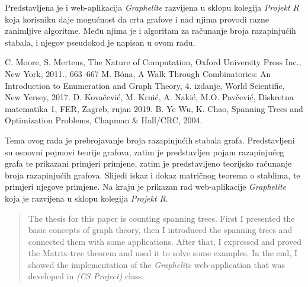 \documentclass[times, utf8, zavrsni]{fer}
\begin{document}
Predstavljena je i web-aplikacija \textit{Graphelite} razvijena u sklopu kolegija \textit{Projekt R} koja korisniku daje mogućnost da crta grafove i nad njima provodi razne zanimljive algoritme. Među njima je i algoritam za računanje broja razapinjućih stabala, i njegov pseudokod je napisan u ovom radu.



\begin{thebibliography}{6}
	C. Moore, S. Mertens, The Nature of Computation, Oxford University Press Inc., New York, 2011., 663--667
	M. Bóna, A Walk Through Combinatorics: An Introduction to Enumeration and Graph Theory, 4. izdanje, World Scientific, New Yersey, 2017.
	D. Kovačević, M. Krnić, A. Nakić, M.O. Pavčević, Diskretna matematika 1, FER, Zagreb, rujan 2019.
	B. Ye Wu, K. Chao, Spanning Trees and Optimization Problems, Chapman \& Hall/CRC, 2004.
\end{thebibliography}

\begin{sazetak}
Tema ovog rada je prebrojavanje broja razapinjućih stabala grafa. Predstavljeni su osnovni pojmovi teorije grafova, zatim je predstavljen pojam razapinjućeg grafa te prikazani primjeri primjene, zatim je predstavljeno teorijsko računanje broja razapinjućih grafova. Slijedi iskaz i dokaz matričnog teorema o stablima, te primjeri njegove primjene. Na kraju je prikazan rad web-aplikacije \textit{Graphelite} koja je razvijena u sklopu kolegija \textit{Projekt R}.

\end{sazetak}

\begin{abstract}
The thesis for this paper is counting spanning trees. First I presented the basic concepts of graph theory, then I introduced the spanning trees and connected them with some applications. After that, I expressed and proved the Matrix-tree theorem and used it to solve some examples. In the end, I showed the implementation of the \textit{Graphelite} web-application that was developed in \textit{(CS Project)} class.

\end{abstract}
\end{document}
